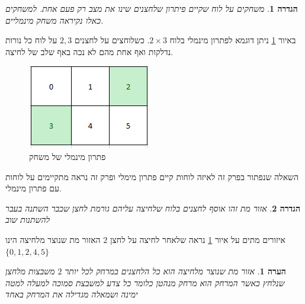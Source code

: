 \documentclass[12pt,twoside]{article}
\newtheorem{definition}{הגדרה}[section]
\newtheorem{comm}{הערה}[section]
\begin{document}
\begin{definition}
משחקים על לוח שקיים פיתרון שלחצנים 
שינו את מצב רק פעם אחת.
למשחקים כאלו נקיראה משחק מינמליים.
\end{definition}

באיור 
\ref{fig: min sol 2x3}
ניתן דוגמא לפתרון מינמלי 
בלוח 
$2 \times 3$.
כשלוחצים על לחצנים 
$2, 3$
על לוח כל נורות נדלקות ואף 
אחת מהם לא נכה באף שלב של לחיצה.

\begin{figure}[ht]
    \caption{פתרון מינמלי של משחק}
    \label{fig: min sol 2x3}
    \unsethebrew
    \centering
    \includegraphics[width=.7\textwidth,height=.7\textheight,keepaspectratio]{images/min_sol_2x3.PNG}
\end{figure}
\sethebrew

השאלה שנפתור בפרק זה לאיזה לוחות קיים פתרון מימלי ופרק זה נראה 
מתקיימים על לוחות עם פתרון מינמלי.

\begin{definition}
    \label{def: dead zone}
    אזור מת זהו אוסף לחצנים בלוח
    שלחיצה עליהם 
    גורמת לחצן שכבר השתנה בעבר להשתנות שוב
\end{definition}

איזורים מתים על איור 
\ref{fig: min sol 2x3}
נראה שלאחר לחיצה על
לחצן
$2$
האזור מת שנוצר מלחיצה הינו
$\{0,1,2,4,5\}$

\begin{comm}
    אזור מת שנוצר מלחיצה 
    הוא כל הלחצנים במרחק לכל יותר 
    $2$
    משבצות מלחצן שנלחץ
    כאשר המרחק הוא מרחק מנהטן כלומר כל צדע למשבצת סמוכה למעלה למטה ימינה ושמאלה מגדילה את המרחק באחד
\end{comm}
\end{document}
